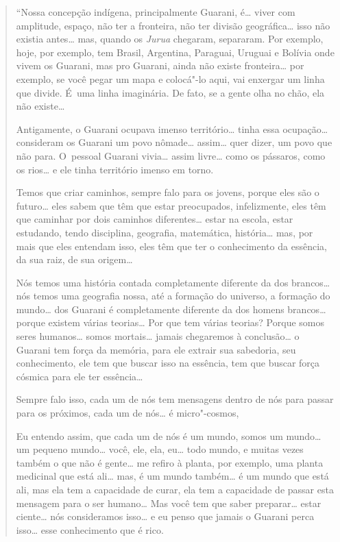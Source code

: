 \begin{quote}
``Nossa concepção indígena, principalmente Guarani, é… viver com
amplitude, espaço, não ter a fronteira, não ter divisão
geográfica… isso não existia antes… mas, quando os
\emph{Jurua} chegaram, separaram. Por exemplo, hoje, por exemplo, tem
Brasil, Argentina, Paraguai, Uruguai e Bolívia onde vivem os Guarani,
mas pro Guarani, ainda não existe fronteira… por exemplo, se você
pegar um mapa e colocá"-lo aqui, vai enxergar um linha que divide. É~uma
linha imaginária. De fato, se a gente olha no chão, ela não
existe…

Antigamente, o Guarani ocupava imenso território… tinha essa
ocupação… consideram os Guarani um povo nômade…
assim… quer dizer, um povo que não para. O~pessoal Guarani
vivia… assim livre… como os pássaros, como os rios…
e ele tinha território imenso em torno.

Temos que criar caminhos, sempre falo para os jovens, porque eles são o
futuro… eles sabem que têm que estar preocupados, infelizmente,
eles têm que caminhar por dois caminhos diferentes… estar na
escola, estar estudando, tendo disciplina, geografia, matemática,
história… mas, por mais que eles entendam isso, eles têm que ter
o conhecimento da essência, da sua raiz, de sua origem…

Nós temos uma história contada completamente diferente da dos
brancos… nós temos uma geografia nossa, até a formação do
universo, a formação do mundo… dos Guarani é completamente
diferente da dos homens brancos… porque existem várias
teorias… Por que tem várias teorias? Porque somos seres
humanos… somos mortais… jamais chegaremos à
conclusão… o Guarani tem força da memória, para ele extrair sua
sabedoria, seu conhecimento, ele tem que buscar isso na essência, tem
que buscar força cósmica para ele ter essência…

Sempre falo isso, cada um de nós tem mensagens dentro de nós para passar
para os próximos, cada um de nós… é micro"-cosmos,

Eu entendo assim, que cada um de nós é um mundo, somos um mundo…
um pequeno mundo… você, ele, ela, eu… todo mundo, e muitas
vezes também o que não é gente… me refiro à planta, por exemplo,
uma planta medicinal que está ali… mas, é um mundo também…
é um mundo que está ali, mas ela tem a capacidade de curar, ela tem a
capacidade de passar esta mensagem para o ser humano… Mas você
tem que saber preparar… estar ciente… nós consideramos
isso… e eu penso que jamais o Guarani perca isso… esse
conhecimento que é rico.


\end{quote}
